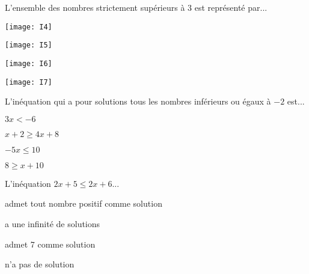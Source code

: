 \begin{QCM}
\begin{GroupeQCM}
      \begin{exercice}
     L'ensemble des nombres strictement supérieurs à 3 est représenté par...
      \begin{ChoixQCM}{4}
      \item \texttt{[image: I4]}
      \item \texttt{[image: I5]}
      \item \texttt{[image: I6]}
      \item \texttt{[image: I7]}
      \end{ChoixQCM}
\begin{corrige}
   \end{corrige}
    \end{exercice}
    
      \begin{exercice}
    L'inéquation qui a pour solutions tous les nombres  inférieurs ou égaux à $− 2$  est...
      \begin{ChoixQCM}{4}
      \item $3x < − 6$
      \item $x+2\geq 4x+8$
      \item $-5x\leq 10$
      \item $8\geq x+10$
      \end{ChoixQCM}
\begin{corrige}
   \end{corrige}
    \end{exercice}
    
      \begin{exercice}
      L'inéquation $2x + 5 \leq 2x + 6$...
      \begin{ChoixQCM}{4}
      \item admet tout nombre positif comme solution
      \item a une infinité de solutions
      \item admet 7 comme solution
      \item n'a pas de solution
      \end{ChoixQCM}
\begin{corrige}
   \end{corrige}
    \end{exercice}
   


\end{GroupeQCM}
\end{QCM}

  